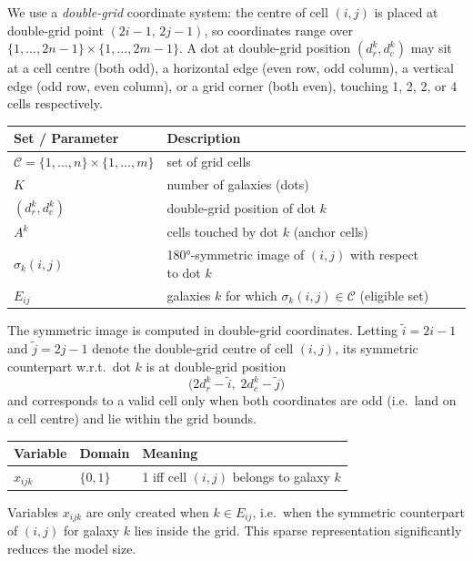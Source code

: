 We use a \emph{double-grid} coordinate system: the centre of cell $(i,j)$ is placed at double-grid point $(2i-1,\, 2j-1)$, so coordinates range over $\{1,\ldots,2n-1\}\times\{1,\ldots,2m-1\}$. A dot at double-grid position $(d_r^k, d_c^k)$ may sit at a cell centre (both odd), a horizontal edge (even row, odd column), a vertical edge (odd row, even column), or a grid corner (both even), touching 1, 2, 2, or 4 cells respectively.

\medskip
\begin{center}
\begin{tabular}{llcc}
\toprule
Set / Parameter & Description \\
\midrule
$\mathcal{C} = \{1,\ldots,n\}\times\{1,\ldots,m\}$ & set of grid cells \\
$K$ & number of galaxies (dots) \\
$(d_r^k, d_c^k)$ & double-grid position of dot $k$ \\
$A^k$ & cells touched by dot $k$ (anchor cells) \\
$\sigma_k(i,j)$ & 180°-symmetric image of $(i,j)$ with respect to dot $k$ \\
$E_{ij}$ & galaxies $k$ for which $\sigma_k(i,j)\in\mathcal{C}$ (eligible set) \\
\bottomrule
\end{tabular}
\end{center}

\medskip\noindent
The symmetric image is computed in double-grid coordinates. Letting
$\tilde{i} = 2i-1$ and $\tilde{j} = 2j-1$ denote the double-grid centre of cell $(i,j)$,
its symmetric counterpart w.r.t.\ dot $k$ is at double-grid position
\[
  \bigl(2d_r^k - \tilde{i},\; 2d_c^k - \tilde{j}\bigr)
\]
and corresponds to a valid cell only when both coordinates are odd
(i.e.\ land on a cell centre) and lie within the grid bounds.

\medskip
\begin{center}
\begin{tabular}{lll}
\toprule
Variable & Domain & Meaning \\
\midrule
$x_{ijk}$ & $\{0,1\}$ & 1 iff cell $(i,j)$ belongs to galaxy $k$ \\
\bottomrule
\end{tabular}
\end{center}

\noindent Variables $x_{ijk}$ are only created when $k \in E_{ij}$, i.e.\ when the symmetric counterpart of $(i,j)$ for galaxy $k$ lies inside the grid. This sparse representation significantly reduces the model size.

